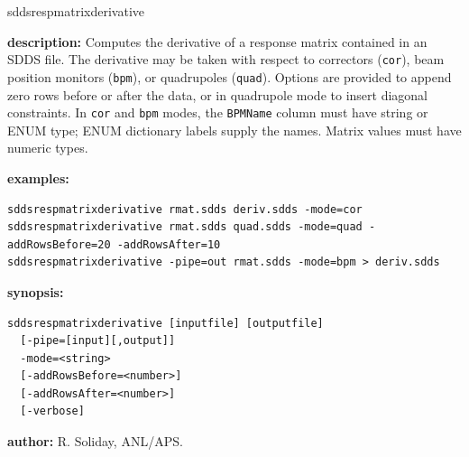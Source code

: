 %
\begin{sddsprog}{sddsrespmatrixderivative}
  \item \textbf{description:} Computes the derivative of a response matrix contained in an SDDS file. The derivative may be taken with respect to correctors (\verb|cor|), beam position monitors (\verb|bpm|), or quadrupoles (\verb|quad|). Options are provided to append zero rows before or after the data, or in quadrupole mode to insert diagonal constraints.
  In \verb|cor| and \verb|bpm| modes, the \verb|BPMName| column must have string or ENUM type; ENUM dictionary labels supply the names. Matrix values must have numeric types.
  \item \textbf{examples:}
    \begin{verbatim}
sddsrespmatrixderivative rmat.sdds deriv.sdds -mode=cor
sddsrespmatrixderivative rmat.sdds quad.sdds -mode=quad -addRowsBefore=20 -addRowsAfter=10
sddsrespmatrixderivative -pipe=out rmat.sdds -mode=bpm > deriv.sdds
    \end{verbatim}
  \item \textbf{synopsis:}
    \begin{verbatim}
sddsrespmatrixderivative [inputfile] [outputfile]
  [-pipe=[input][,output]]
  -mode=<string>
  [-addRowsBefore=<number>]
  [-addRowsAfter=<number>]
  [-verbose]
    \end{verbatim}
  \item \textbf{author:} R. Soliday, ANL/APS.
\end{sddsprog}
